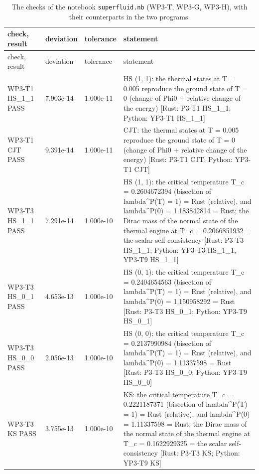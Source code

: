 \documentclass[aps,prd,onecolumn,superscriptaddress,nofootinbib,floatfix,longbibliography]{revtex4-2}
\begin{document}
\begingroup\fontsize{7}{8.5}\selectfont\setlength{\tabcolsep}{3pt}
\begin{longtable}{p{}p{}p{}p{}}
\caption{The checks of the notebook \texttt{superfluid.nb} (WP3-T, WP3-G, WP3-H), with their counterparts in the two programs.}\\
\hline\hline
check, result & deviation & tolerance & statement \\ \hline
\endfirsthead
\hline check, result & deviation & tolerance & statement \\ \hline
\endhead
\hline\hline
\endlastfoot
WP3-T1 HS\_1\_1 \newline PASS & 7.903e-14 & 1.000e-11 & HS (1, 1): the thermal states at T = 0.005 reproduce the ground state of T = 0 (\textbar{}change of Phi0\textbar{} + relative change of the energy) [Rust: P3-T1 HS\_1\_1; Python: YP3-T1 HS\_1\_1] \\
WP3-T1 CJT \newline PASS & 9.391e-14 & 1.000e-11 & CJT: the thermal states at T = 0.005 reproduce the ground state of T = 0 (\textbar{}change of Phi0\textbar{} + relative change of the energy) [Rust: P3-T1 CJT; Python: YP3-T1 CJT] \\
WP3-T3 HS\_1\_1 \newline PASS & 7.291e-14 & 1.000e-10 & HS (1, 1): the critical temperature T\_c = 0.2604672394 (bisection of lambda\textasciicircum{}P(T) = 1) = Rust (relative), and lambda\textasciicircum{}P(0) = 1.183842814 = Rust; the Dirac mass of the normal state of the thermal engine at T\_c = 0.2066851932 = the scalar self-consistency [Rust: P3-T3 HS\_1\_1; Python: YP3-T3 HS\_1\_1, YP3-T9 HS\_1\_1] \\
WP3-T3 HS\_0\_1 \newline PASS & 4.653e-13 & 1.000e-10 & HS (0, 1): the critical temperature T\_c = 0.2404654563 (bisection of lambda\textasciicircum{}P(T) = 1) = Rust (relative), and lambda\textasciicircum{}P(0) = 1.150958292 = Rust [Rust: P3-T3 HS\_0\_1; Python: YP3-T9 HS\_0\_1] \\
WP3-T3 HS\_0\_0 \newline PASS & 2.056e-13 & 1.000e-10 & HS (0, 0): the critical temperature T\_c = 0.2137990984 (bisection of lambda\textasciicircum{}P(T) = 1) = Rust (relative), and lambda\textasciicircum{}P(0) = 1.11337598 = Rust [Rust: P3-T3 HS\_0\_0; Python: YP3-T9 HS\_0\_0] \\
WP3-T3 KS \newline PASS & 3.755e-13 & 1.000e-10 & KS: the critical temperature T\_c = 0.2221187371 (bisection of lambda\textasciicircum{}P(T) = 1) = Rust (relative), and lambda\textasciicircum{}P(0) = 1.11337598 = Rust; the Dirac mass of the normal state of the thermal engine at T\_c = 0.1622929325 = the scalar self-consistency [Rust: P3-T3 KS; Python: YP3-T9 KS] \\

\end{longtable}
\end{document}
